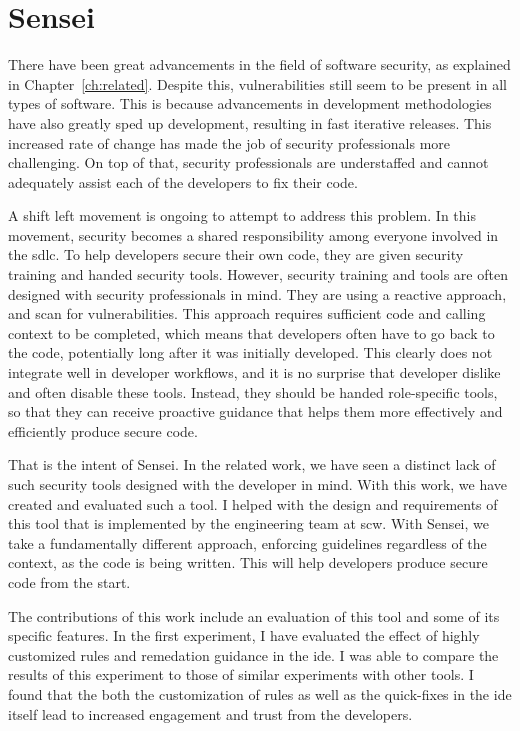 \section{Sensei}
There have been great advancements in the field of software security, as explained in Chapter~\ref{ch:related}.
Despite this, vulnerabilities still seem to be present in all types of software.
This is because advancements in development methodologies have also greatly sped up development, resulting in fast iterative releases.
This increased rate of change has made the job of security professionals more challenging.
On top of that, security professionals are understaffed and cannot adequately assist each of the developers to fix their code.

A shift left movement is ongoing to attempt to address this problem.
In this movement, security becomes a shared responsibility among everyone involved in the \gls{sdlc}.
To help developers secure their own code, they are given security training and handed security tools.
However, security training and tools are often designed with security professionals in mind.
They are using a reactive approach, and scan for vulnerabilities.
This approach requires sufficient code and calling context to be completed, which means that developers often have to go back to the code, potentially long after it was initially developed.
This clearly does not integrate well in developer workflows, and it is no surprise that developer dislike and often disable these tools.
Instead, they should be handed role-specific tools, so that they can receive proactive guidance that helps them more effectively and efficiently produce secure code.

That is the intent of Sensei.
In the related work, we have seen a distinct lack of such security tools designed with the developer in mind.
With this work, we have created and evaluated such a tool.
I helped with the design and requirements of this tool that is implemented by the engineering team at \gls{scw}.
With Sensei, we take a fundamentally different approach, enforcing guidelines regardless of the context, as the code is being written.
This will help developers produce secure code from the start.

The contributions of this work include an evaluation of this tool and some of its specific features.
In the first experiment, I have evaluated the effect of highly customized rules and remedation guidance in the \gls{ide}.
I was able to compare the results of this experiment to those of similar experiments with other tools.
I found that the both the customization of rules as well as the quick-fixes in the \gls{ide} itself lead to increased engagement and trust from the developers.

